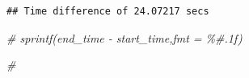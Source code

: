 \documentclass[
]{article}
\newenvironment{Shaded}{\begin{snugshade}}{\end{snugshade}}
\newcommand{\CommentTok}[1]{\textcolor[rgb]{0.56,0.35,0.01}{\textit{#1}}}
\begin{document}
\begin{verbatim}
## Time difference of 24.07217 secs
\end{verbatim}

\begin{Shaded}
\begin{Highlighting}[]
  \CommentTok{\# sprintf(end\_time {-} start\_time,fmt = \textquotesingle{}\%\#.1f\textquotesingle{})}
\end{Highlighting}
\end{Shaded}

\begin{Shaded}
\begin{Highlighting}[]
\CommentTok{\#}
\end{Highlighting}
\end{Shaded}
\end{document}
